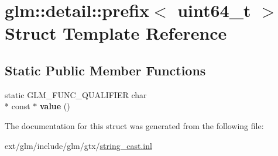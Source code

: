 \hypertarget{structglm_1_1detail_1_1prefix_3_01uint64__t_01_4}{\section{glm\-:\-:detail\-:\-:prefix$<$ uint64\-\_\-t $>$ Struct Template Reference}
\label{structglm_1_1detail_1_1prefix_3_01uint64__t_01_4}
}
\subsection*{Static Public Member Functions}
\begin{DoxyCompactItemize}
\item 
\hypertarget{structglm_1_1detail_1_1prefix_3_01uint64__t_01_4_a70571c67b5d9aadad2b0d3ea937fa392}{static G\-L\-M\-\_\-\-F\-U\-N\-C\-\_\-\-Q\-U\-A\-L\-I\-F\-I\-E\-R char \\*
const $\ast$ {\bfseries value} ()}\label{structglm_1_1detail_1_1prefix_3_01uint64__t_01_4_a70571c67b5d9aadad2b0d3ea937fa392}

\end{DoxyCompactItemize}


The documentation for this struct was generated from the following file\-:\begin{DoxyCompactItemize}
\item 
ext/glm/include/glm/gtx/\hyperlink{string__cast_8inl}{string\-\_\-cast.\-inl}\end{DoxyCompactItemize}
